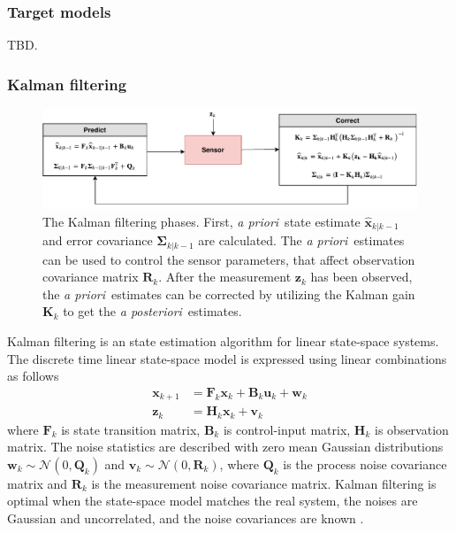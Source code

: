 \documentclass[english, 12pt, a4paper, elec, utf8, a-1b, online]{aaltothesis}
\renewcommand{\vec}[1]{\mathbf{#1}}
\newcommand{\xprior}{\hat{\vec{x}}_{k|k-1}}
\newcommand{\priorecov}{\boldsymbol{\Sigma}_{k|k-1}}
\newcommand{\x}{\vec{x}_k}
\newcommand{\xnext}{\vec{x}_{k+1}}
\newcommand{\z}{\vec{z}_k}
\newcommand{\stmodel}{\vec{F}_k}
\newcommand{\cimodel}{\vec{B}_k}
\newcommand{\cinput}{\vec{u}_k}
\newcommand{\pnoise}{\vec{w}_k}
\newcommand{\omodel}{\vec{H}_k}
\newcommand{\onoise}{\vec{v}_k}
\newcommand{\ocov}{\vec{R}_k}
\newcommand{\pcov}{\vec{Q}_k}
\newcommand{\gain}{\vec{K}_k}
\newcommand{\normal}[2]{\mathcal{N}\left(#1, #2 \right)}
\def\prior{\textit{a priori}\ }
\def\post{\textit{a posteriori}\ }
\begin{document}
\subsubsection{Target models} \label{sec:target_models}

TBD.

\subsubsection{Kalman filtering}

\begin{figure}[b]
    \centering
    \includegraphics[width=\textwidth]{figures/KF.pdf}
    \caption{The Kalman filtering phases.
    First, \prior state estimate $\xprior$ and error covariance $\priorecov$ are calculated.
    The \prior estimates can be used to control the sensor parameters, that affect observation covariance matrix $\ocov$.
    After the measurement $\z$ has been observed, the \prior estimates can be corrected by utilizing the Kalman gain $\gain$ to get the \post estimates.
    }
    \label{fig:KF}
\end{figure}

Kalman filtering is an state estimation algorithm for linear state-space systems.
The discrete time linear state-space model is expressed using linear combinations as follows 
\begin{align}
    \xnext &= \stmodel \x + \cimodel \cinput + \pnoise \label{eq:lsp_state} \\
    \z &= \omodel \x + \onoise \label{eq:lsp_obs}
\end{align}
where $\stmodel$ is state transition matrix, $\cimodel$ is control-input matrix, $ \omodel $ is observation matrix. 
The noise statistics are described with zero mean Gaussian distributions $\pnoise \sim \normal{0}{\pcov}$ and $\onoise \sim \normal{0}{\ocov}$, where $\pcov$ is the process noise covariance matrix and $\ocov$ is the measurement noise covariance matrix.
Kalman filtering is optimal when the state-space model matches the real system, the noises are Gaussian and uncorrelated, and the noise covariances are known \cite{Krishnamurthy2016}.
\end{document}
